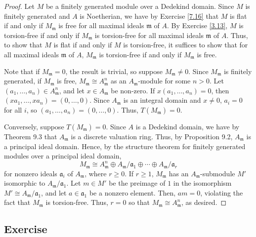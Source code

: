 \begin{proof}
Let $M$ be a finitely generated module over a Dedekind domain. Since $M$ is finitely generated and $A$ is Noetherian, we have by Exercise \ref{7.16} that
$M$ is flat if and only if $M_{\mathfrak{m}}$ is free for all maximal ideals $\mathfrak{m}$ of $A$. By Exercise \ref{3.13}, $M$ is torsion-free if and only 
if $M_{\mathfrak{m}}$ is torsion-free for all maximal ideals $\mathfrak{m}$ of $A$. Thus, to show that $M$ is flat if and only if $M$ is torsion-free, it
suffices to show that for all maximal ideals $\mathfrak{m}$ of $A$, $M_{\mathfrak{m}}$ is torsion-free if and only if $M_{\mathfrak{m}}$ is free.

Note that if $M_{\mathfrak{m}} = 0$, the result is trivial, so suppose $M_{\mathfrak{m}} \neq 0$. Since $M_{\mathfrak{m}}$ is finitely generated,
if $M_{\mathfrak{m}}$ is free, $M_{\mathfrak{m}} \cong A_{\mathfrak{m}}^n$ as an $A_{\mathfrak{m}}$-module for some $n > 0$. Let 
$(a_1,\ldots,a_n) \in A_{\mathfrak{m}}^n$, and let $x \in A_{\mathfrak{m}}$ be non-zero. If $x(a_1,\ldots,a_n) = 0$, then $(xa_1,\ldots,xa_n) = (0,\ldots,0)$.
Since $A_{\mathfrak{m}}$ is an integral domain and $x \neq 0$, $a_i = 0$ for all $i$, so $(a_1,\ldots,a_n) = (0,\ldots,0)$. Thus, $T(M_{\mathfrak{m}}) = 0$.

Conversely, suppose $T(M_{\mathfrak{m}}) = 0$. Since $A$ is a Dedekind domain, we have by Theorem 9.3 that $A_{\mathfrak{m}}$ is a discrete valuation ring. Thus, 
by Proposition 9.2, $A_{\mathfrak{m}}$ is a principal ideal domain. Hence, by the structure theorem for finitely generated modules over a principal ideal domain,
$$M_{\mathfrak{m}} \cong A_{\mathfrak{m}}^n \oplus A_{\mathfrak{m}}/\mathfrak{a}_1 \oplus \cdots \oplus A_{\mathfrak{m}}/\mathfrak{a}_r$$
for nonzero ideals $\mathfrak{a}_i$ of $A_{\mathfrak{m}}$, where $r \ge 0$. If $r \ge 1$, $M_{\mathfrak{m}}$ has an $A_{\mathfrak{m}}$-submodule $M'$ isomorphic to
$A_{\mathfrak{m}}/\mathfrak{a}_1$. Let $m \in M'$ be the preimage of $1$ in the isomorphism $M' \cong A_{\mathfrak{m}}/\mathfrak{a}_1$, and let $a \in \mathfrak{a}_1$
be a nonzero element. Then, $a m = 0$, violating the fact that $M_{\mathfrak{m}}$ is torsion-free. Thus, $r = 0$ so that $M_{\mathfrak{m}} \cong A_{\mathfrak{m}}^n$,
as desired.
\end{proof}

\subsection{Exercise}\label{9.6}

